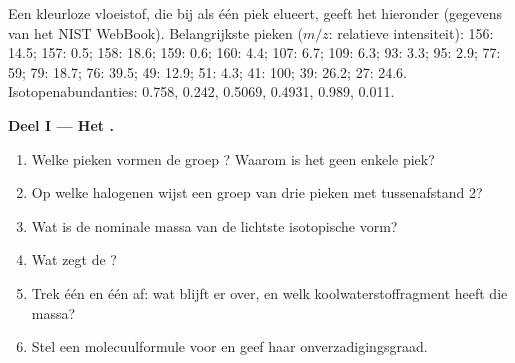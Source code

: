 \begin{problem}
\label{pb:b2:mass-spec-atomic:1}
Een kleurloze vloeistof, die bij  als één piek elueert, geeft het  hieronder (gegevens van het NIST
WebBook). Belangrijkste pieken ($m/z$: relatieve intensiteit): 156: 14.5; 157: 0.5; 158: 18.6; 159: 0.6; 160:
4.4; 107: 6.7; 109: 6.3; 93: 3.3; 95: 2.9; 77: 59; 79: 18.7; 76: 39.5; 49: 12.9; 51: 4.3; 41: 100; 39:
26.2; 27: 24.6. Isotopenabundanties:  0.758,  0.242,  0.5069,
 0.4931,  0.989,  0.011.

\begin{center}
\end{center}

\medskip
\noindent\textbf{Deel I --- Het .}
\begin{enumerate}
  \item Welke pieken vormen de groep ? Waarom is het geen enkele piek?
  \item Op welke halogenen wijst een groep van drie pieken met tussenafstand 2?
  \item Wat is de nominale massa van de lichtste isotopische vorm?
  \item Wat zegt de ?
  \item Trek één  en één  af: wat blijft er over, en welk koolwaterstoffragment
        heeft die massa?
  \item Stel een molecuulformule voor en geef haar onverzadigingsgraad.
\end{enumerate}


\end{problem}
